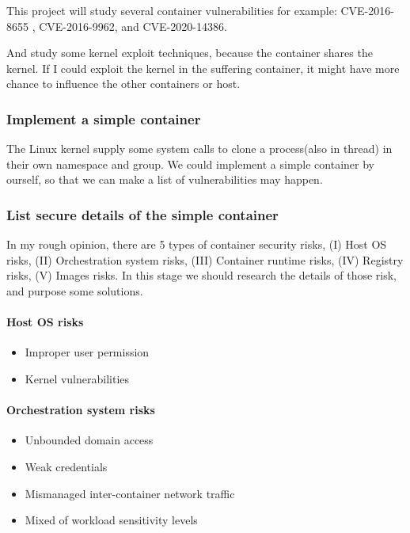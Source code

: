 \documentclass[12pt,a4paper,oneside]{IEEEconf}
\begin{document}
This project will study several container vulnerabilities for example: CVE-2016-8655
\cite{CVE-2016-8655}, CVE-2016-9962\cite{CVE-2016-9962}, and CVE-2020-14386\cite{CVE-2020-14386}.

And study some kernel exploit techniques\cite{Kernel_exploitation}, because the container shares
the kernel. If I could exploit the kernel in the suffering container, it might have more chance
to influence the other containers or host.

\subsubsection{Implement a simple container}
The Linux kernel supply some system calls to clone a process(also in thread) in their own namespace
and group. We could implement a simple container by ourself, so that we can make a list of
vulnerabilities may happen.
\UseRawInputEncoding

\subsubsection{List secure details of the simple container}
In my rough opinion, there are 5 types of container security risks, (\RN{1}) Host OS risks, (\RN{2})
Orchestration system risks, (\RN{3}) Container runtime risks, (\RN{4}) Registry risks, (\RN{5})
Images risks. In this stage we should research the details of those risk, and purpose some solutions.

\paragraph{Host OS risks}
\begin{itemize}
  \item Improper user permission
  \item Kernel vulnerabilities
\end{itemize}

\paragraph{Orchestration system risks}
\begin{itemize}
  \item Unbounded domain access
  \item Weak credentials
  \item Mismanaged inter-container network traffic
  \item Mixed of workload sensitivity levels
\end{itemize}
\end{document}

